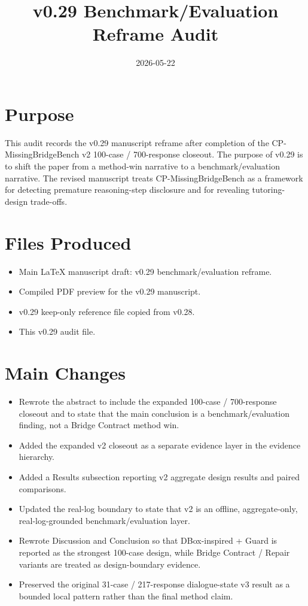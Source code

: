 \documentclass[11pt]{article}
\title{v0.29 Benchmark/Evaluation Reframe Audit}
\author{}
\date{2026-05-22}
\begin{document}
\maketitle

\section{Purpose}

This audit records the v0.29 manuscript reframe after completion of the CP-MissingBridgeBench v2 100-case / 700-response closeout. The purpose of v0.29 is to shift the paper from a method-win narrative to a benchmark/evaluation narrative. The revised manuscript treats CP-MissingBridgeBench as a framework for detecting premature reasoning-step disclosure and for revealing tutoring-design trade-offs.

\section{Files Produced}

\begin{itemize}
  \item Main LaTeX manuscript draft: v0.29 benchmark/evaluation reframe.
  \item Compiled PDF preview for the v0.29 manuscript.
  \item v0.29 keep-only reference file copied from v0.28.
  \item This v0.29 audit file.
\end{itemize}

\section{Main Changes}

\begin{itemize}
  \item Rewrote the abstract to include the expanded 100-case / 700-response closeout and to state that the main conclusion is a benchmark/evaluation finding, not a Bridge Contract method win.
  \item Added the expanded v2 closeout as a separate evidence layer in the evidence hierarchy.
  \item Added a Results subsection reporting v2 aggregate design results and paired comparisons.
  \item Updated the real-log boundary to state that v2 is an offline, aggregate-only, real-log-grounded benchmark/evaluation layer.
  \item Rewrote Discussion and Conclusion so that DBox-inspired + Guard is reported as the strongest 100-case design, while Bridge Contract / Repair variants are treated as design-boundary evidence.
  \item Preserved the original 31-case / 217-response dialogue-state v3 result as a bounded local pattern rather than the final method claim.
\end{itemize}
\end{document}
